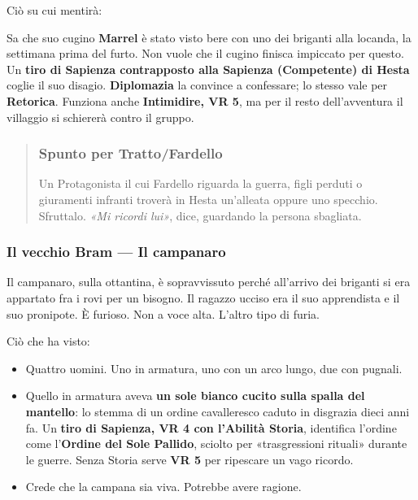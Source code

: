 \documentclass[10pt,a4paper]{article}
\newcommand{\tightlist}{\setlength{\itemsep}{0pt}\setlength{\parskip}{0pt}}
\begin{document}
Ciò su cui mentirà:

Sa che suo cugino \textbf{Marrel} è stato visto bere con uno dei briganti alla locanda, la settimana prima del furto. Non vuole che il cugino finisca impiccato per questo. Un \textbf{tiro di Sapienza contrapposto alla Sapienza (Competente) di Hesta} coglie il suo disagio. \textbf{Diplomazia} la convince a confessare; lo stesso vale per \textbf{Retorica}. Funziona anche \textbf{Intimidire, VR 5}, ma per il resto dell'avventura il villaggio si schiererà contro il gruppo.

\begin{quote}
\subsubsection{Spunto per Tratto/Fardello}\label{spunto-per-tratto-e-fardello}

Un Protagonista il cui Fardello riguarda la guerra, figli perduti o giuramenti infranti troverà in Hesta un'alleata oppure uno specchio. Sfruttalo. \emph{«Mi ricordi lui»}, dice, guardando la persona sbagliata.
\end{quote}

\subsubsection{Il vecchio Bram --- Il campanaro}\label{il-vecchio-bram-il-campanaro}

Il campanaro, sulla ottantina, è sopravvissuto perché all'arrivo dei briganti si era appartato fra i rovi per un bisogno. Il ragazzo ucciso era il suo apprendista e il suo pronipote. È furioso. Non a voce alta. L'altro tipo di furia.

Ciò che ha visto:

\begin{itemize}
\tightlist
\item
  Quattro uomini. Uno in armatura, uno con un arco lungo, due con pugnali.
\item
  Quello in armatura aveva \textbf{un sole bianco cucito sulla spalla del mantello}: lo stemma di un ordine cavalleresco caduto in disgrazia dieci anni fa. Un \textbf{tiro di Sapienza, VR 4 con l'Abilità Storia}, identifica l'ordine come l'\textbf{Ordine del Sole Pallido}, sciolto per «trasgressioni rituali» durante le guerre. Senza Storia serve \textbf{VR 5} per ripescare un vago ricordo.
\item
  Crede che la campana sia viva. Potrebbe avere ragione.
\end{itemize}
\end{document}
